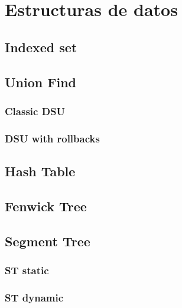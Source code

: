 \newpage
\section{Estructuras de datos}

\subsection{Indexed set}


\subsection{Union Find}

\subsubsection{Classic DSU}


\subsubsection{DSU with rollbacks}


\subsection{Hash Table}


\subsection{Fenwick Tree}


\subsection{Segment Tree}
\subsubsection{ST static}

\subsubsection{ST dynamic}

